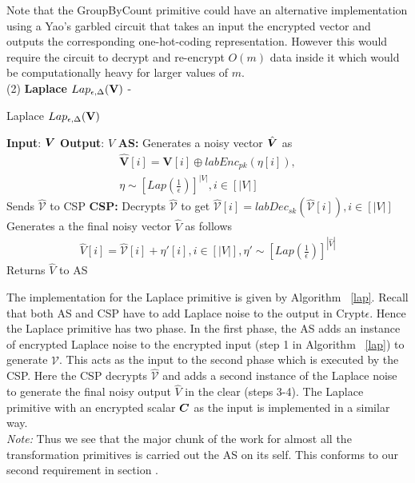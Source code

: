 Note that the \textsf{GroupByCount} primitive could have an alternative implementation using a Yao's garbled circuit that takes an input the encrypted vector and outputs the corresponding one-hot-coding representation. However this would require the circuit to decrypt and re-encrypt $O(m)$ data inside it which would be computationally heavy for larger values of $m$. 
 \\ (2)\textbf{ \textsf{Laplace }}$Lap_{\epsilon,\Delta}(\mathbf{V})$ -  
\begin{algorithm}
\small
\caption{\textsf{Laplace }$Lap_{\epsilon,\Delta}(\mathbf{V})$}
\begin{algorithmic}[1]
\STATEx
\textbf{Input}: $\boldsymbol{V}$
\STATEx \textbf{Output}: $\hat{V}$
\STATEx \textbf{\textsf{AS}:} \STATE Generates a noisy vector $\hat{\boldsymbol{V}}$  as \begin{gather*}\hat{\mathbf{V}}[i] = \mathbf{V}[i]\oplus labEnc_{pk}(\eta[i]),\\ \eta \sim [Lap(\frac{1}{\epsilon})]^{|V|}, i \in [|V|] \end{gather*}
\STATE Sends $\hat{\mathbb{\mathcal{V}}}$  to \textsf{CSP}
\STATEx \textbf{\textsf{CSP}:}
\STATE Decrypts $\mathbf{\hat{\mathcal{V}}}$ to get $\hat{\mathcal{V}}[i]=labDec_{sk}(\mathbf{\hat{\mathcal{V}}}[i]), i \in [|V|]$
\STATE Generates a the final noisy vector $\hat{V}$ as follows 
\begin{gather*} \hat{V}[i]=\hat{\mathcal{V}}[i]+\eta'[i], i \in [|V|], \eta' \sim [Lap(\frac{1}{\epsilon})]^{|\hat{V}|} \end{gather*}
\STATE Returns $\hat{V}$ to \textsf{AS}
 \end{algorithmic} \label{lap}
\end{algorithm} The implementation for the \textsf{Laplace} primitive is given by Algorithm ~\ref{lap}. Recall that both \textsf{AS} and \textsf{CSP} have to add Laplace noise to the output in Crypt$\epsilon$. Hence the \textsf{Laplace} primitive has two phase. In the first phase,  the \textsf{AS} adds an instance of encrypted Laplace noise to the encrypted input (step 1 in Algorithm ~\ref{lap}) to generate $\mathbf{\hat{\mathcal{V}}}$. This acts as the input to the second phase which is executed by the \textsf{CSP}. Here the \textsf{CSP} decrypts $\mathbf{\hat{\mathcal{V}}}$ and adds a second instance of the Laplace noise to generate the final noisy output $\hat{V}$ in the clear (steps 3-4). The \textsf{Laplace} primitive with an encrypted scalar $\boldsymbol{C}$ as the input is implemented in a similar way. \\
\textit{Note:} Thus we see that the major chunk of the work for almost all the transformation primitives is carried out the \textsf{AS} on its self. This conforms to our second requirement in section .
